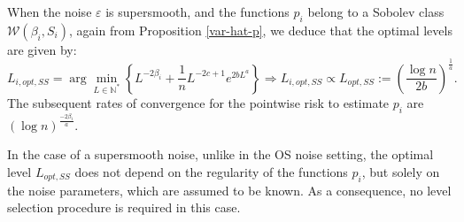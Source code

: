 \documentclass[11pt,a4paper,openany]{article}
\newtheorem{proposition}[thm]{Proposition}
\def\N{\mathbb{N}}
\def\E{\mathbb{E}}
\begin{document}
\noindent When the noise $\varepsilon$ is supersmooth, and the functions $p_i$ belong to a Sobolev class $\mathcal{W}(\beta_i, S_i)$, again from Proposition \ref{var-hat-p}, we deduce that the optimal levels are given by:
\begin{equation} \label{Lopt-SS}
L_{i, {opt, SS}} = \arg \min_{L \in \N^*} \left \{ L^{-2\beta_i} + \frac{1}{n} L^{-2c +1}  e^{2bL^a }\right \} \Rightarrow
L_{i,{opt, SS}}  \varpropto L_{{opt, SS}} := \left( \frac{\log n }{2b}\right)^{\frac 1 a }.
\end{equation}
 The subsequent rates of convergence for the pointwise risk to estimate  $p_i$ are  $\left( {\log n}\right )^{\frac {-2 \beta_i }{a}  }$.

\medskip



 In the case of a supersmooth noise, unlike in the OS noise setting, the optimal level $L_{opt, SS}$ does not depend on the regularity of the functions $p_i$, but solely on the noise parameters, which are assumed to be known. As a consequence, no level selection procedure is required in this case.

%
%
\end{document}
